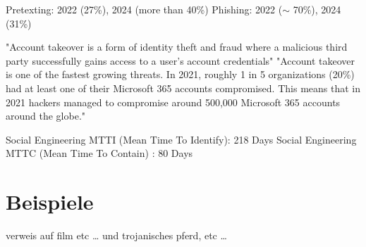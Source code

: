 Pretexting: 2022 (27\%), 2024 (more than 40\%)
Phishing: 2022 ($\sim$ 70\%), 2024 (31\%)\cite{verizon2024,verizon2022}

"Account takeover is a form of identity theft and fraud where a
malicious third party successfully gains access to a user’s account
credentials"\cite{3_barracuda}
"Account takeover is one of the fastest growing threats. In 2021,
roughly 1 in 5 organizations (20\%) had at least one of their
Microsoft 365 accounts compromised. This means that in 2021
hackers managed to compromise around 500,000 Microsoft 365
accounts around the globe."\cite{3_barracuda}

Social Engineering MTTI (Mean Time To Identify): 218 Days
Social Engineering MTTC (Mean Time To Contain) :  80 Days\cite{6_ibmsecurity}


\section{Beispiele}

verweis auf film etc \dots
und trojanisches pferd, etc \dots
